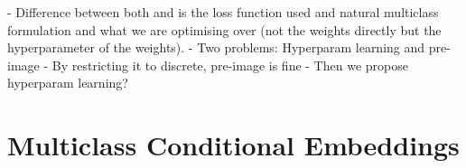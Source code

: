 \documentclass[twoside]{article}
\begin{document}
	
	
	
	
	
	
	
	
	- Difference between both \citep{rifkin2003regularized} and \citep{pahikkala2012unsupervised} is the loss function used and natural multiclass formulation and what we are optimising over (not the weights directly but the hyperparameter of the weights).
	- Two problems: Hyperparam learning and pre-image
	- By restricting it to discrete, pre-image is fine
	- Then we propose hyperparam learning?
	


	\section{Multiclass Conditional Embeddings}
	\label{sec:multiclass_conditional_embedding}
	
\end{document}
